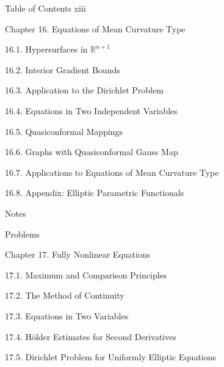 \nobreak
\noindent Table of Contents \hfill xiii

\medskip

\noindent Chapter 16.  Equations of Mean Curvature Type 

\noindent\hspace*{1.5em}16.1.  Hypersurfaces in $\mathbb R^{n+1}$ 

\noindent\hspace*{1.5em}16.2.  Interior Gradient Bounds 

\noindent\hspace*{1.5em}16.3.  Application to the Dirichlet Problem 

\noindent\hspace*{1.5em}16.4.  Equations in Two Independent Variables 

\noindent\hspace*{1.5em}16.5.  Quasiconformal Mappings 

\noindent\hspace*{1.5em}16.6.  Graphs with Quasiconformal Gauss Map 

\noindent\hspace*{1.5em}16.7.  Applications to Equations of Mean Curvature Type 

\noindent\hspace*{1.5em}16.8.  Appendix: Elliptic Parametric Functionals 

\noindent Notes 

\noindent Problems 

\bigskip

\noindent Chapter 17.  Fully Nonlinear Equations 

\noindent\hspace*{1.5em}17.1.  Maximum and Comparison Principles 

\noindent\hspace*{1.5em}17.2.  The Method of Continuity 

\noindent\hspace*{1.5em}17.3.  Equations in Two Variables 

\noindent\hspace*{1.5em}17.4.  Hölder Estimates for Second Derivatives 

\noindent\hspace*{1.5em}17.5.  Dirichlet Problem for Uniformly Elliptic Equations 

